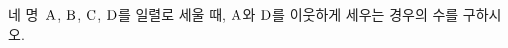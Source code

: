 \hspace*{2mm}\begin{minipage}[t]{\dimexpr\linewidth-2mm\relax}\vspace{0pt}
네 명~$\mathrm{A}$, $\mathrm{B}$, $\mathrm{C}$, $\mathrm{D}$를 일렬로 세울 때, $\mathrm{A}$와 $\mathrm{D}$를 이웃하게 세우는 경우의 수를 구하시오.\end{minipage}
